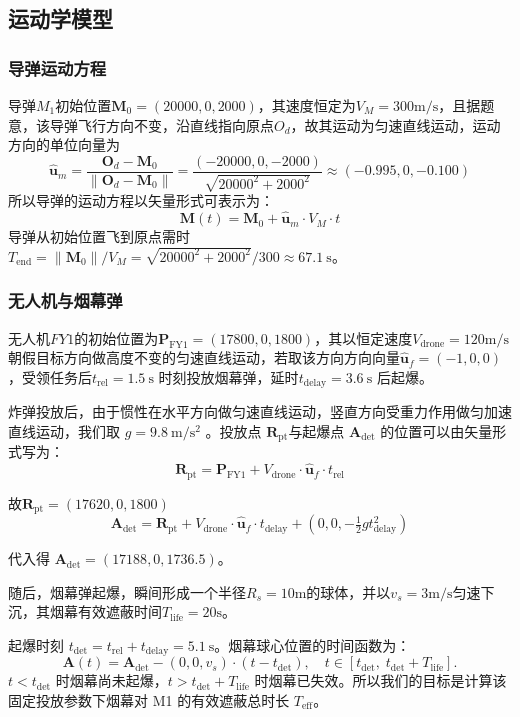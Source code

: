\documentclass{ctexart}
\begin{document}
\subsection{运动学模型}
\subsubsection{导弹运动方程}
导弹$M_1$初始位置$\mathbf{M}_0=(20000,0,2000)$，其速度恒定为$V_M=300\mathrm{m/s}$，且据题意，该导弹飞行方向不变，沿直线指向原点$O_d$，故其运动为匀速直线运动，运动方向的单位向量为
\[
\hat{\mathbf{u}}_m = \frac{\mathbf{O}_d - \mathbf{M}_0}{\|\mathbf{O}_d - \mathbf{M}_0\|}
= \frac{(-20000, 0, -2000)}{\sqrt{20000^2 + 2000^2}} \approx (-0.995, 0, -0.100)
\]
所以导弹的运动方程以矢量形式可表示为：
\[
\mathbf{M}(t) = \mathbf{M}_0 + \hat{\mathbf{u}}_m \cdot V_M \cdot t
\]
导弹从初始位置飞到原点需时 $T_{\text{end}} = \|\mathbf{M}_0\| / V_M = \sqrt{20000^2 + 2000^2}/300 \approx 67.1\ \mathrm{s}$。
\subsubsection{无人机与烟幕弹}
无人机$FY1$的初始位置为$\mathbf{P}_{\text{FY1}}=(17800,0,1800)$，其以恒定速度$V_{\text{drone}}=120\mathrm{m/s}$朝假目标方向做高度不变的匀速直线运动，若取该方向方向向量$\hat{\mathbf{u}}_f = (-1, 0, 0)$，受领任务后$t_{\text{rel}} = 1.5\ \mathrm{s}$ 时刻投放烟幕弹，延时$t_{\text{delay}} = 3.6\ \mathrm{s}$ 后起爆。

炸弹投放后，由于惯性在水平方向做匀速直线运动，竖直方向受重力作用做匀加速直线运动，我们取 $g = 9.8\ \mathrm{m/s^2}$ 。投放点 $\mathbf{R}_{\text{pt}}$与起爆点 $\mathbf{A}_{\text{det}}$ 的位置可以由矢量形式写为：
\[
\mathbf{R}_{\text{pt}} = \mathbf{P}_{\text{FY1}} + V_{\text{drone}} \cdot \hat{\mathbf{u}}_f \cdot t_{\text{rel}}
\]

故$\mathbf{R}_\text{pt}= (17620, 0, 1800) $
\[
\mathbf{A}_{\text{det}} = \mathbf{R}_{\text{pt}} + V_{\text{drone}} \cdot \hat{\mathbf{u}}_f \cdot t_{\text{delay}} + (0, 0, -\tfrac{1}{2} g t_{\text{delay}}^2)
\]

代入得 $\mathbf{A}_{\text{det}} = (17188, 0, 1736.5)$。

随后，烟幕弹起爆，瞬间形成一个半径$R_s=10\mathrm{m}$的球体，并以$v_s=3\mathrm{m/s}$匀速下沉，其烟幕有效遮蔽时间$T_\text{life}=20\mathrm{s}$。

起爆时刻 $t_{\text{det}} = t_{\text{rel}} + t_{\text{delay}} = 5.1\ \mathrm{s}$。烟幕球心位置的时间函数为：
\[
\mathbf{A}(t) = \mathbf{A}_{\text{det}} - (0, 0, v_s) \cdot (t - t_{\text{det}}), \quad t \in [t_{\text{det}},\; t_{\text{det}}+ T_{\text{life}}].
\]
$t < t_{\text{det}}$ 时烟幕尚未起爆，$t > t_{\text{det}} + T_{\text{life}}$ 时烟幕已失效。所以我们的目标是计算该固定投放参数下烟幕对 M1 的有效遮蔽总时长 $T_{\text{eff}}$。
\end{document}
